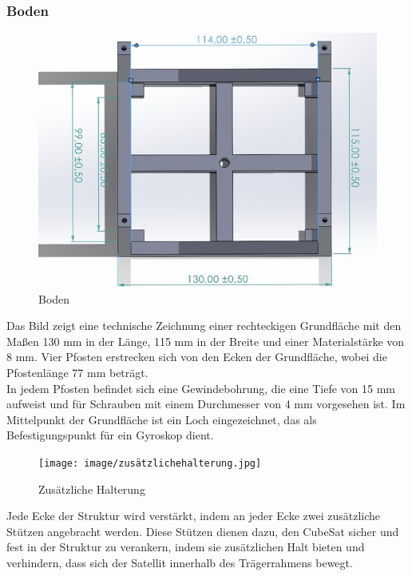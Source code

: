 \subsubsection{Boden}
\begin{figure}[H]
    \centering
    \includegraphics[scale = 0.5]{image/boden.jpg}
    \caption{Boden}
    \label{fig:enter-label}
\end{figure}
\vspace{3mm}
Das Bild zeigt eine technische Zeichnung einer rechteckigen Grundfläche mit den Maßen 130 mm in der Länge, 115 mm in der Breite und einer Materialstärke von 8 mm. Vier Pfosten erstrecken sich von den Ecken der Grundfläche, wobei die Pfostenlänge 77 mm beträgt.\\
\vspace{3mm}
In jedem Pfosten befindet sich eine Gewindebohrung, die eine Tiefe von 15 mm aufweist und für Schrauben mit einem Durchmesser von 4 mm vorgesehen ist. Im Mittelpunkt der Grundfläche ist ein Loch eingezeichnet, das als Befestigungspunkt für ein Gyroskop dient.\\
\vspace{3mm}
\begin{figure}[H]
    \centering
    \texttt{[image: image/zusätzlichehalterung.jpg]}
    \caption{Zusätzliche Halterung }
    \label{fig:enter-label}
\end{figure}
\vspace{3mm}
Jede Ecke der Struktur wird verstärkt, indem an jeder Ecke zwei zusätzliche Stützen angebracht werden. Diese Stützen dienen dazu, den CubeSat sicher und fest in der Struktur zu verankern, indem sie zusätzlichen Halt bieten und verhindern, dass sich der Satellit innerhalb des Trägerrahmens bewegt.\\
